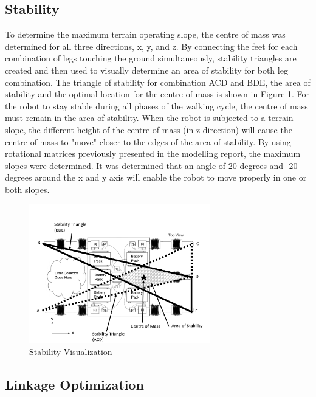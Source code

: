 \subsection{Stability} \label{sec:stability}
To determine the maximum terrain operating slope, the centre of mass was determined for all three directions, x, y, and z. By connecting the feet for each combination of legs touching the ground simultaneously, stability triangles are created and then used to visually determine an area of stability for both leg combination. The triangle of stability for combination ACD and BDE, the area of stability and the optimal location for the centre of mass is shown in Figure \ref{fig:stability}. For the robot to stay stable during all phases of the walking cycle, the centre of mass must remain in the area of stability. When the robot is subjected to a terrain slope, the different height of the centre of mass (in z direction) will cause the centre of mass to "move" closer to the edges of the area of stability. By using rotational matrices previously presented in the modelling report, the maximum slopes were determined. It was determined that an angle of 20 degrees and -20 degrees around the x and y axis will enable the robot to move properly in one or both slopes. 

\begin{figure}
    \centering
    \includegraphics[width=0.7\textwidth]{3_SystemModelling/img/Stability.PNG}
    \caption{Stability Visualization}
    \label{fig:stability}
\end{figure}


\subsection{Linkage Optimization} \label{subsec:linkage_optimization}

